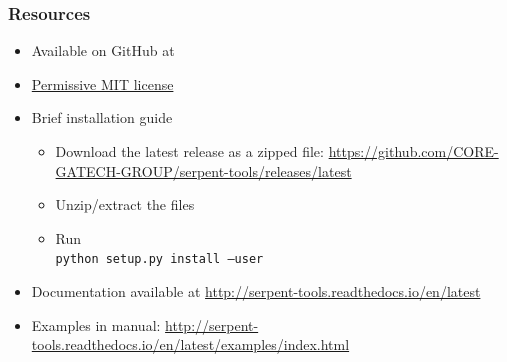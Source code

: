 \begin{frame}
    \frametitle{Resources}
            \begin{itemize}
                \item Available on GitHub at \github{}
                \item \href{https://github.com/CORE-GATECH-GROUP/serpent-tools/blob/master/LICENSE}{Permissive MIT license}
                \item Brief installation guide
                    \begin{itemize}
                        \item Download the latest release as a zipped file: \url{https://github.com/CORE-GATECH-GROUP/serpent-tools/releases/latest}
                        \item Unzip/extract the files
                        \item Run \\ \texttt{python setup.py install --user}
                    \end{itemize}
                \item Documentation available at \url{http://serpent-tools.readthedocs.io/en/latest}
                \item<handout> Examples in manual: \url{http://serpent-tools.readthedocs.io/en/latest/examples/index.html}
            \end{itemize}
\end{frame}


